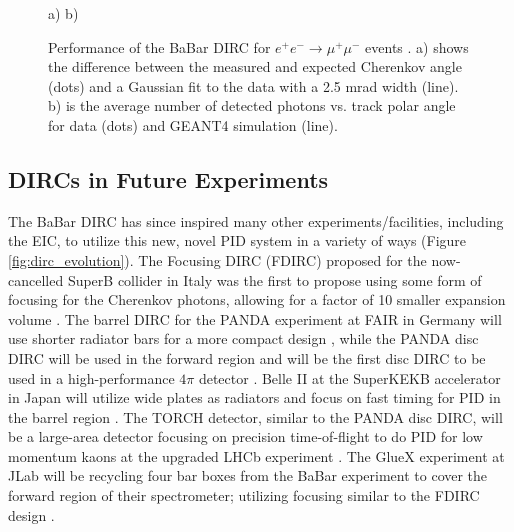 \begin{figure}[!htb]
	\centering
	a)%
	b)%
	\caption[Performance of the BaBar DIRC for $e^{+}e^{-} \rightarrow \mu^{+}\mu^{-}$ events. a) shows the difference between the measured and expected Cherenkov angle (dots) and a Gaussian fit to the data with a 2.5 mrad width (line). b) is the average number of detected photons vs. track polar angle for data (dots) and GEANT4 simulation (line).]{Performance of the BaBar DIRC for $e^{+}e^{-} \rightarrow \mu^{+}\mu^{-}$ events \cite{BaBarDIRC}. a) shows the difference between the measured and expected Cherenkov angle (dots) and a Gaussian fit to the data with a 2.5 mrad width (line). b) is the average number of detected photons vs. track polar angle for data (dots) and GEANT4 \cite{GEANT4} simulation (line).}
	\label{fig:babarperformance}
\end{figure}

\subsection{DIRCs in Future Experiments}
The BaBar DIRC has since inspired many other experiments/facilities, including the EIC, to utilize this new, novel PID system in a variety of ways (Figure \ref{fig:dirc_evolution}). The Focusing DIRC (FDIRC) proposed for the now-cancelled SuperB collider in Italy was the first to propose using some form of focusing for the Cherenkov photons, allowing for a factor of 10 smaller expansion volume \cite{FDIRC} \cite{FDIRC2}. The barrel DIRC for the PANDA experiment at FAIR in Germany will use shorter radiator bars for a more compact design \cite{PANDA_barrel}, while the PANDA disc DIRC will be used in the forward region and will be the first disc DIRC to be used in a high-performance $4\pi$ detector \cite{PANDA_disc}. Belle II at the SuperKEKB accelerator in Japan will utilize wide plates as radiators and focus on fast timing for PID in the barrel region \cite{Belle2_TOP}. The TORCH detector, similar to the PANDA disc DIRC, will be a large-area detector focusing on precision time-of-flight to do PID for low momentum kaons at the upgraded LHCb experiment \cite{TORCH}. The GlueX experiment at JLab will be recycling four bar boxes from the BaBar experiment to cover the forward region of their spectrometer; utilizing  focusing similar to the FDIRC design \cite{GlueX}.

